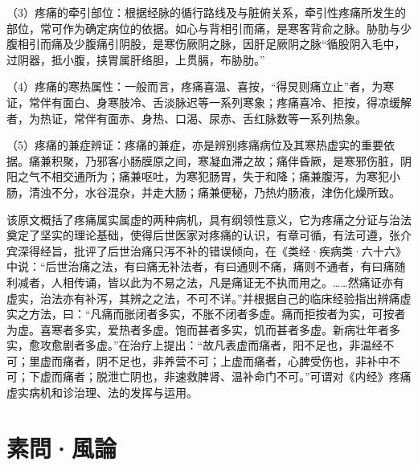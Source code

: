 \documentclass[draft,12pt]{ctexbook}
\begin{document}
（3）疼痛的牵引部位：根据经脉的循行路线及与脏俯关系，牵引性疼痛所发生的部位，常可作为确定病位的依据。如心与背相引而痛，是寒客背俞之脉。胁肋与少腹相引而痛及少腹痛引阴股，是寒伤厥阴之脉，因肝足厥阴之脉“循股阴入毛中，过阴器，抵小腹，挟胃属肝络胆，上贯膈，布胁肋。”

（4）疼痛的寒热属性：一般而言，疼痛喜温、喜按，“得炅则痛立止”者，为寒证，常伴有面白、身寒肢冷、舌淡脉迟等一系列寒象；疼痛喜冷、拒按，得凉缓解者，为热证，常伴有面赤、身热、口渴、尿赤、舌红脉数等一系列热象。

（5）疼痛的兼症辨证：疼痛的兼症，亦是辨别疼痛病位及其寒热虚实的重要依据。痛兼积聚，乃邪客小肠膜原之间，寒凝血滞之故；痛伴昏厥，是寒邪伤脏，阴阳之气不相交通所为；痛兼呕吐，为寒犯肠胃，失于和降；痛兼腹泻，为寒犯小肠，清浊不分，水谷混杂，并走大肠；痛兼便秘，乃热灼肠液，津伤化燥所致。



该原文概括了疼痛属实属虚的两种病机，具有纲领性意义，它为疼痛之分证与治法奠定了坚实的理论基础，使得后世医家对疼痛的认识，有章可循，有法可遵，张介宾深得经旨，批评了后世治痛只泻不补的错误倾向，在《类经·疾病类·六十六》中说：“后世治痛之法，有曰痛无补法者，有曰通则不痛，痛则不通者，有曰痛随利减者，人相传诵，皆以此为不易之法，凡是痛证无不执而用之。……然痛证亦有虚实，治法亦有补泻，其辨之之法，不可不详。”并根据自己的临床经验指出辨痛虚实之方法，曰：“凡痛而胀闭者多实，不胀不闭者多虚。痛而拒按者为实，可按者为虚。喜寒者多实，爱热者多虚。饱而甚者多实，饥而甚者多虚。新病壮年者多实，愈攻愈剧者多虚。”在治疗上提出：“故凡表虚而痛者，阳不足也，非温经不可；里虚而痛者，阴不足也，非养营不可；上虚而痛者，心脾受伤也，非补中不可；下虚而痛者；脱泄亡阴也，非速救脾肾、温补命门不可。”可谓对《内经》疼痛虚实病机和诊治理、法的发挥与运用。


\section{素問·風論}%

\end{document}
